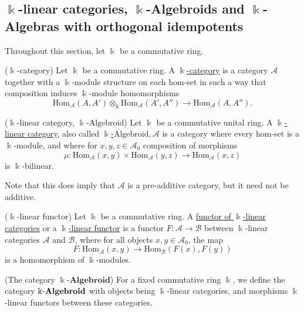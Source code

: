 \subsection{$\Bbbk$-linear categories, $\Bbbk$-Algebroids and $ \Bbbk$-Algebras with orthogonal idempotents}

Throughout this section, let $\Bbbk$ be a commutative ring.

\begin{definition}{($\Bbbk$-category)}
Let $\Bbbk$ be a commutative ring. A \ul{$\Bbbk$-category} is a category $\mathcal{A}$ together with a $\Bbbk$-module structure
on each hom-set in such a way that composition induces $\Bbbk$-module homomorphisms
\[
\mathrm{Hom}_{\mathcal{A}}(A,A')\otimes_{\Bbbk}\mathrm{Hom}_{\mathcal{A}}(A',A'') \rightarrow \mathrm{Hom}_{\mathcal{A}}(A,A'').
\]
\end{definition}

\begin{definition}{($\Bbbk$-linear category, $\Bbbk$-$\mathrm{Algebroid}$)}
Let $\Bbbk$ be a commutative unital ring. A \ul{$\Bbbk$-linear category}, also called \ul{$\Bbbk$-$\mathrm{Algebroid}$},$\,\mathcal{A}$ is a
category where every hom-set is a $\Bbbk$-module, and where for $x,y,z \in \mathcal{A}_{0}$ composition of morphisms
\[
\mu : \mathrm{Hom}_{\mathcal{A}}(x,y) \times \mathrm{Hom}_{\mathcal{A}}(y,z) \rightarrow \mathrm{Hom}_{\mathcal{A}}(x,z)
\]
is $\Bbbk$-bilinear.

Note that this does imply that $\mathcal{A}$ is a pre-additive category, but it need not be additive.
\end{definition}

\begin{definition}{($\Bbbk$-linear functor)}
Let $\Bbbk$ be a commutative ring. A \ul{functor of $\Bbbk$-linear categories} or a \ul{$\Bbbk$-linear functor} is a functor
$F : \mathcal{A} \rightarrow \mathcal{B}$ between $\Bbbk$-linear categories $\mathcal{A}$ and $\mathcal{B}$,
where for all objects $x, y \in \mathcal{A}_{0}$, the map
\[
F : \mathrm{Hom}_{\mathcal{A}}(x,y) \rightarrow \mathrm{Hom}_{\mathcal{B}}(F(x), F(y))
\]
is a homomorphism of $\Bbbk$-modules.
\end{definition}

\begin{definition}{(The category $\Bbbk$-$\mathbf{Algebroid}$)}
For a fixed commutative ring $\Bbbk$, we define the category $\Bbbk\textnormal{-}\mathbf{Algebroid}$ with objects being
$\Bbbk$-linear categories, and morphisms $\Bbbk$-linear functors between these categories.
\end{definition}

